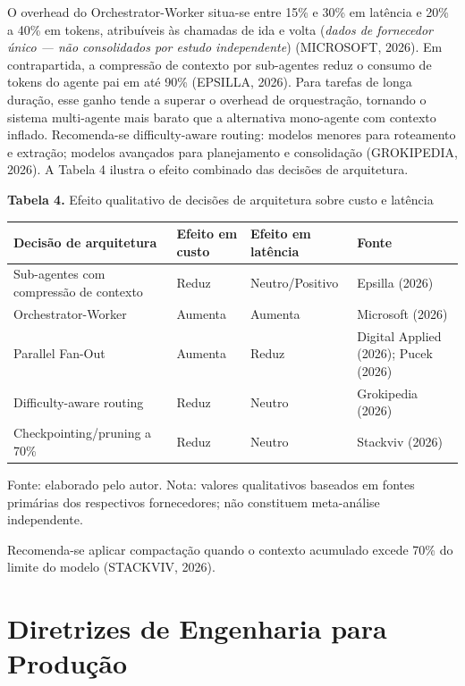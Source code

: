 \documentclass[12pt,a4paper]{article}
\begin{document}
O overhead do Orchestrator-Worker situa-se entre 15\% e 30\% em latência e 20\% a 40\% em tokens, atribuíveis às chamadas de ida e volta (\textit{dados de fornecedor único — não consolidados por estudo independente}) (MICROSOFT, 2026). Em contrapartida, a compressão de contexto por sub-agentes reduz o consumo de tokens do agente pai em até 90\% (EPSILLA, 2026). Para tarefas de longa duração, esse ganho tende a superar o overhead de orquestração, tornando o sistema multi-agente mais barato que a alternativa mono-agente com contexto inflado. Recomenda-se difficulty-aware routing: modelos menores para roteamento e extração; modelos avançados para planejamento e consolidação (GROKIPEDIA, 2026). A Tabela 4 ilustra o efeito combinado das decisões de arquitetura.

\textbf{Tabela 4.} Efeito qualitativo de decisões de arquitetura sobre custo e latência

\begin{center}
{\small
\setlength{\tabcolsep}{4pt}
\begin{tabularx}{\linewidth}{>{\raggedright\arraybackslash}X>{\centering\arraybackslash}X>{\centering\arraybackslash}X>{\raggedright\arraybackslash}X}
\toprule
\textbf{Decisão de arquitetura} & \textbf{Efeito em custo} & \textbf{Efeito em latência} & \textbf{Fonte} \\
\midrule
Sub-agentes com compressão de contexto & Reduz & Neutro/Positivo & Epsilla (2026) \\
Orchestrator-Worker & Aumenta & Aumenta & Microsoft (2026) \\
Parallel Fan-Out & Aumenta & Reduz & Digital Applied (2026); Pucek (2026) \\
Difficulty-aware routing & Reduz & Neutro & Grokipedia (2026) \\
Checkpointing/pruning a 70\% & Reduz & Neutro & Stackviv (2026) \\
\bottomrule
\end{tabularx}
}
\end{center}

Fonte: elaborado pelo autor. Nota: valores qualitativos baseados em fontes primárias dos respectivos fornecedores; não constituem meta-análise independente.

Recomenda-se aplicar compactação quando o contexto acumulado excede 70\% do limite do modelo (STACKVIV, 2026).


\section{Diretrizes de Engenharia para Produção}
\end{document}
